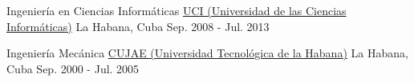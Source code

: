 
\begin{cventries}

  \cventry
    {Ingeniería en Ciencias Informáticas} %
    {\faUniversity \hphantom{-} \href{https://www.uci.cu/}{UCI (Universidad de las Ciencias Informáticas)}} %
    {La Habana, Cuba} %
    {Sep. 2008 - Jul. 2013} %
    {
      \begin{cvitems} %
      \end{cvitems}
    }

  \cventry
    {Ingeniería Mecánica} %
    {\faUniversity \hphantom{-} \href{http://cujae.edu.cu/}{CUJAE (Universidad Tecnológica de la Habana)}} %
    {La Habana, Cuba} %
    {Sep. 2000 - Jul. 2005} %
    {
      \begin{cvitems} %
      \end{cvitems}
    }

\end{cventries}
